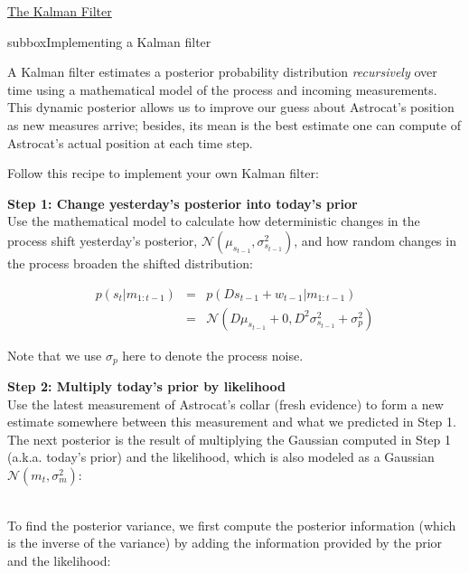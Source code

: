 \begin{textbox}{\href{http://instructor.compneuro.neuromatch.io/tutorials/W3D2_HiddenDynamics/instructor/W3D2_Tutorial3.html}{The Kalman Filter }   }

\begin{subbox}{subbox}{Implementing a Kalman filter}
\scriptsize

A Kalman filter estimates a posterior probability distribution \textit{recursively} over time using a mathematical model of the process and incoming measurements. This dynamic posterior allows us to improve our guess about Astrocat's position as new measures arrive; besides, its mean is the best estimate one can compute of Astrocat's actual position at each time step.

Follow this recipe to implement your own Kalman filter:

\textbf{Step 1: Change yesterday's posterior into today's prior}\\

Use the mathematical model to calculate how deterministic changes in the process shift yesterday's posterior, $\mathcal{N}(\mu_{s_{t-1}}, \sigma_{s_{t-1}}^2)$, and how random changes in the process broaden the shifted distribution:

\begin{align*}
p(s_t|m_{1:t-1}) &=& p(Ds_{t-1}+w_{t-1} | m_{1:t-1})\\ 
&=& \mathcal{N}(D\mu_{s_{t-1}} + 0, D^2\sigma_{s_{t-1}}^2 +\sigma_p^2)
\end{align*}

Note that we use $\sigma_p$ here to denote the process noise.

\textbf{Step 2: Multiply today's prior by likelihood} \\

Use the latest measurement of Astrocat's collar (fresh evidence) to form a new estimate somewhere between this measurement and what we predicted in Step 1. The next posterior is the result of multiplying the Gaussian computed in Step 1 (a.k.a. today's prior) and the likelihood, which is also modeled as a Gaussian $\mathcal{N}(m_t, \sigma_m^2)$:

\\

To find the posterior variance, we first compute the posterior information (which is the inverse of the variance) by adding the information provided by the prior and the likelihood:


\end{subbox}
\end{textbox}

